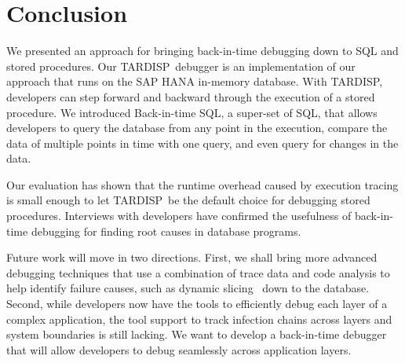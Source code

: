 \documentclass[english,conference,final]{IEEEtran}
\newcommand{\tool}{TAR\-DISP}
\newcommand{\SQLextension}{Back-in-time SQL}
\begin{document}
\section{Conclusion}
\label{sec:conclusion}

\balance
We presented an approach for bringing back-in-time debugging down to SQL and stored procedures.
Our \tool\ debugger is an implementation of our approach that runs on the SAP HANA in-memory database.
With \tool, developers can step forward and backward through the execution of a stored procedure.
We introduced \SQLextension, a super-set of SQL, that allows developers to query the database from any point in the execution, compare the data of multiple points in time with one query, and even query for changes in the data.

Our evaluation has shown that the runtime overhead caused by execution tracing is small enough to let \tool\ be the default choice for debugging stored procedures.
Interviews with developers have confirmed the usefulness of back-in-time debugging for finding root causes in database programs.

Future work will move in two directions.
First, we shall bring more advanced debugging techniques that use a combination of trace data and code analysis to help identify failure causes, such as dynamic slicing~\cite{agrawal_dynamic_1990} down to the database.
Second, while developers now have the tools to efficiently debug each layer of a complex application, the tool support to track infection chains across layers and system boundaries is still lacking.
We want to develop a back-in-time debugger that will allow developers to debug seamlessly across application layers.


%

\end{document}
